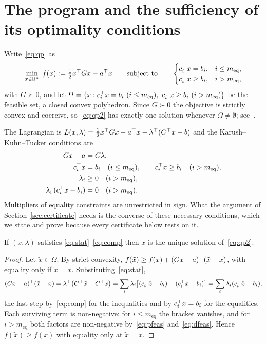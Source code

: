\section{The program and the sufficiency of its optimality conditions}
\label{sec:problem}

Write~\eqref{eq:qp} as
\begin{equation}
  \min_{x \in \mathbb{R}^n} \; f(x) := \tfrac12 x^{\top} G x - a^{\top} x
  \qquad \text{subject to} \qquad
  \begin{cases}
    c_i^{\top} x = b_i, & i \le m_{\mathrm{eq}},\\
    c_i^{\top} x \ge b_i, & i > m_{\mathrm{eq}},
  \end{cases}
  \label{eq:qp2}
\end{equation}
with $G \succ 0$, and let
$\Omega = \{x : c_i^{\top} x = b_i \ (i \le m_{\mathrm{eq}}),\ c_i^{\top} x \ge b_i \
(i > m_{\mathrm{eq}})\}$ be the feasible set, a closed convex polyhedron. Since
$G \succ 0$ the objective is strictly convex and coercive, so~\eqref{eq:qp2} has
exactly one solution whenever $\Omega \neq \emptyset$; see~\cite[Ch.~16]{nocedal2006}.

The Lagrangian is $L(x,\lambda) = \tfrac12 x^{\top} G x - a^{\top} x - \lambda^{\top}(C^{\top} x - b)$
and the Karush--Kuhn--Tucker conditions are
\begin{align}
  G x - a &= C \lambda, \label{eq:stat}\\
  c_i^{\top} x &= b_i \quad (i \le m_{\mathrm{eq}}), \qquad
  c_i^{\top} x \ge b_i \quad (i > m_{\mathrm{eq}}), \label{eq:pfeas}\\
  \lambda_i &\ge 0 \quad (i > m_{\mathrm{eq}}), \label{eq:dfeas}\\
  \lambda_i\,(c_i^{\top} x - b_i) &= 0 \quad (i > m_{\mathrm{eq}}). \label{eq:comp}
\end{align}
Multipliers of equality constraints are unrestricted in sign. What the argument of
Section~\ref{sec:certificate} needs is the converse of these necessary conditions,
which we state and prove because every certificate below rests on it.

\begin{proposition}[Sufficiency]\label{prop:sufficient}
If $(x,\lambda)$ satisfies \eqref{eq:stat}--\eqref{eq:comp} then $x$ is the
unique solution of~\eqref{eq:qp2}.
\end{proposition}

\begin{proof}
Let $\tilde x \in \Omega$. By strict convexity,
$f(\tilde x) \ge f(x) + (G x - a)^{\top}(\tilde x - x)$, with equality only if
$\tilde x = x$. Substituting~\eqref{eq:stat},
\[
  (G x - a)^{\top}(\tilde x - x)
  = \lambda^{\top}\bigl(C^{\top} \tilde x - C^{\top} x\bigr)
  = \sum_i \lambda_i\bigl[(c_i^{\top}\tilde x - b_i) - (c_i^{\top} x - b_i)\bigr]
  = \sum_i \lambda_i (c_i^{\top} \tilde x - b_i),
\]
the last step by~\eqref{eq:comp} for the inequalities and by $c_i^{\top} x = b_i$ for
the equalities. Each surviving term is non-negative: for $i \le m_{\mathrm{eq}}$
the bracket vanishes, and for $i > m_{\mathrm{eq}}$ both factors are non-negative
by~\eqref{eq:pfeas} and~\eqref{eq:dfeas}. Hence $f(\tilde x) \ge f(x)$ with
equality only at $\tilde x = x$.
\end{proof}

